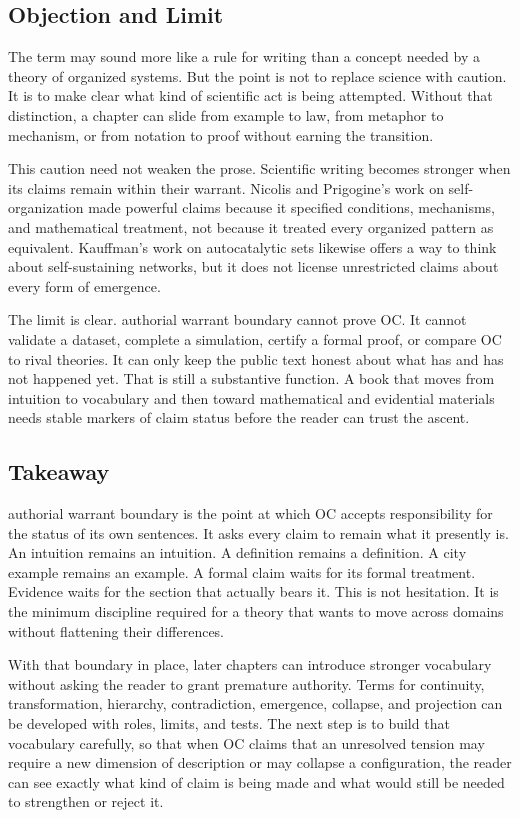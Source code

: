 \documentclass[11pt,a4paper,openany]{book}
\begin{document}
\subsection{Objection and Limit}
The term may sound more like a rule for writing than a concept needed by a theory of organized systems. But the point is not to replace science with caution. It is to make clear what kind of scientific act is being attempted. Without that distinction, a chapter can slide from example to law, from metaphor to mechanism, or from notation to proof without earning the transition. \cite{prigogine_dissipative,haken_synergetics}\par
This caution need not weaken the prose. Scientific writing becomes stronger when its claims remain within their warrant. Nicolis and Prigogine's work on self-organization made powerful claims because it specified conditions, mechanisms, and mathematical treatment, not because it treated every organized pattern as equivalent. Kauffman's work on autocatalytic sets likewise offers a way to think about self-sustaining networks, but it does not license unrestricted claims about every form of emergence.\par
The limit is clear. authorial warrant boundary cannot prove OC. It cannot validate a dataset, complete a simulation, certify a formal proof, or compare OC to rival theories. It can only keep the public text honest about what has and has not happened yet. That is still a substantive function. A book that moves from intuition to vocabulary and then toward mathematical and evidential materials needs stable markers of claim status before the reader can trust the ascent.\par
\subsection{Takeaway}
authorial warrant boundary is the point at which OC accepts responsibility for the status of its own sentences. It asks every claim to remain what it presently is. An intuition remains an intuition. A definition remains a definition. A city example remains an example. A formal claim waits for its formal treatment. Evidence waits for the section that actually bears it. This is not hesitation. It is the minimum discipline required for a theory that wants to move across domains without flattening their differences. \cite{prigogine_dissipative,haken_synergetics}\par
With that boundary in place, later chapters can introduce stronger vocabulary without asking the reader to grant premature authority. Terms for continuity, transformation, hierarchy, contradiction, emergence, collapse, and projection can be developed with roles, limits, and tests. The next step is to build that vocabulary carefully, so that when OC claims that an unresolved tension may require a new dimension of description or may collapse a configuration, the reader can see exactly what kind of claim is being made and what would still be needed to strengthen or reject it.\par
\end{document}
